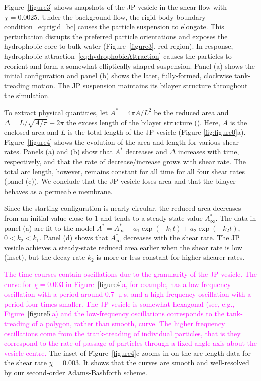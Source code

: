 \documentclass[lineno]{jfm}
\newcommand{\ReviewerThree}[1]{\textcolor{magenta}{#1}}
\begin{document}
Figure~\ref{figure3} shows snapshots of the JP vesicle in the shear flow
with $\chi=0.0025$. Under the background flow, the rigid-body boundary
condition~\eqref{eq:rigid_bc} causes the particle suspension to
elongate. This perturbation disrupts the preferred particle orientations
and exposes the hydrophobic core to bulk water (Figure~\ref{figure3},
red region). In response, hydrophobic
attraction~\eqref{eq:hydrophobicAttraction} causes the particles to
reorient and form a somewhat elliptically-shaped suspension. Panel (a)
shows the initial configuration and panel (b) shows the later,
fully-formed, clockwise tank-treading motion. The JP suspension
maintains its bilayer structure throughout the simulation. 
%

To extract physical quantities, let $A^* = 4\pi A/L^2$ be the reduced
area and $\Delta=L/\sqrt{A/\pi} - 2\pi$ the excess length of the bilayer
structure (\cite{Finken08}). Here, $A$ is the enclosed area and $L$ is
the total length of the JP vesicle (Figure \ref{fig:figure0}a).
Figure~\ref{figure4} shows the evolution of the area and length for
various shear rates. Panels (a) and (b) show that $A^*$ decreases and
$\Delta$ increases with time, respectively, and that the rate of
decrease/increase grows with shear rate. The total arc length, however,
remains constant for all time for all four shear rates (panel (c)). We
conclude that the JP vesicle loses area and that the bilayer behaves as
a permeable membrane. 

Since the starting configuration is nearly circular, the reduced area
decreases from an initial value close to $1$ and tends to a steady-state
value $A^*_{\infty}$. The data in panel (a) are fit to the model $A^* =
A^*_{\infty} + a_1 \exp(-k_1t) + a_2 \exp(-k_2t),$ $0 < k_2 <
k_1$. Panel (d) shows that $A^*_{\infty}$ decreases with the shear rate.
The JP vesicle achieves a steady-state reduced area earlier when the
shear rate is low (inset), but the decay rate $k_2$ is more or less
constant for higher shearer rates. 

\ReviewerThree{The time courses contain oscillations due to the
granularity of the JP vesicle.
The curve for $\chi = 0.003$ in Figure~\ref{figure4}a, for example, 
has a low-frequency oscillation with a period around $0.7$ $\upmu$s,
and a high-frequency oscillation with a period four times smaller.
The JP vesicle is somewhat hexagonal (see, e.g., Figure~\ref{figure5}a)
and the low-frequency oscillations corresponds to the tank-treading of a 
polygon, rather than smooth, curve. The higher frequency oscillations
come from the trank-treading of individual particles, that is
they correspond to the rate of passage of particles through a fixed-angle
axis about the vesicle centre.} 
The inset of Figure~\ref{figure4}c zooms
in on the arc length data for the shear rate $\chi = 0.003$. It shows
that the curves are smooth and well-resolved by our second-order
Adams-Bashforth scheme.
\end{document}
